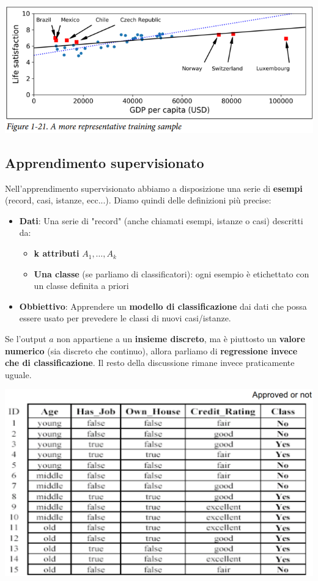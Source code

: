 \documentclass[12pt]{article}
\begin{document}
\begin{center}
    \includegraphics[width =0.80\linewidth]{Images/67.PNG}
\end{center}
\newpage
\subsection{Apprendimento supervisionato}
Nell'apprendimento supervisionato abbiamo a disposizione una serie di \textbf{esempi} (record, casi, istanze, ecc...).
Diamo quindi delle definizioni più precise:
\begin{itemize}
    \item \textbf{Dati}: Una serie di "record" (anche chiamati esempi, istanze o casi) descritti da:
    \begin{itemize}
        \item \textbf{k attributi} $A_1, \dots, A_k$
        \item \textbf{Una classe} (se parliamo di classificatori): ogni esempio è etichettato con un classe definita a priori
    \end{itemize}
    \item \textbf{Obbiettivo}: Apprendere un \textbf{modello di classificazione} dai dati che possa essere usato per prevedere le classi di nuovi casi/istanze.
\end{itemize}
Se l'output $a$ non appartiene a un \textbf{insieme discreto}, ma è piuttosto un \textbf{valore numerico} (sia discreto che continuo), allora parliamo di \textbf{regressione invece che di classificazione}.
Il resto della discussione rimane invece praticamente uguale.
\begin{center}
    \includegraphics[width =0.80\linewidth]{Images/68.PNG}
\end{center}
\end{document}
